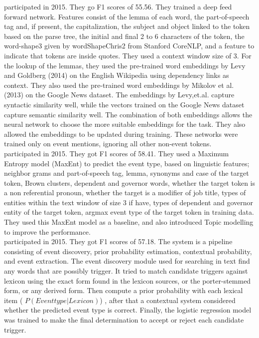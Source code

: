 \indent \cite{reimers2015event} participated in 2015. They go F1 scores of 55.56. They trained a deep feed forward network. Features consist of the lemma of each word, the part-of-speech tag and, if present,  the capitalization, the subject and object linked to the token based on the parse tree, the initial and ﬁnal 2 to 6 characters of the token, the word-shape3 given by wordShapeChris2 from Stanford CoreNLP, and a feature to indicate that tokens are inside quotes. They used a context window size of 3. For the lookup of the lemmas, they used the pre-trained word embeddings by Levy and Goldberg (2014) on the English Wikipedia using dependency links as context. They also used the pre-trained word embeddings by Mikolov et al. (2013) on the Google News dataset. The embeddings by Levy,et.al. capture syntactic similarity well, while the vectors trained on the Google News dataset capture semantic similarity well. The combination of both embeddings allows the neural network to choose the more suitable embeddings for the task. They also allowed the embeddings to be updated during training. These networks were trained only on event mentions, ignoring all other non-event tokens. \\
\indent \cite{hong2015rpi} participated in 2015. They got F1 scores of 58.41. They used a Maximum Entropy model (MaxEnt) to predict the event type, based on linguistic features; neighbor grams and part-of-speech tag, lemma, synonyms and case of the target token, Brown clusters, dependent and governor words, whether the target token is a non referential pronoun, whether the target is a modiﬁer of job title, types of entities within the text window of size 3 if have, types of dependent and governor entity of the target token, argmax event type of the target token in training data. They used this MaxEnt model as a baseline, and also introduced Topic modelling to improve the performance.\\
\indent \cite{monahan2015populating} participated in 2015. They got F1 scores of 57.18. The system is a pipeline consisting of event discovery, prior probability estimation, contextual probability, and event extraction. The event discovery module used for searching in text find any words that are possibly trigger. It tried to match candidate triggers against lexicon using the exact form found in the lexicon sources, or the porter-stemmed form, or any derived form. Then compute a prior probability with each lexical item ( $P(Eventtype|Lexicon)$) , after that a contextual system considered whether the predicted event type is correct. Finally, the logistic regression model was trained to make the ﬁnal determination to accept or reject each candidate trigger. 
